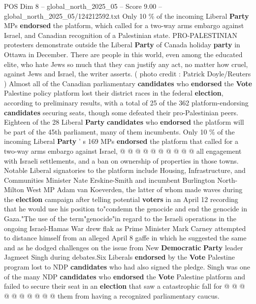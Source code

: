 \begin{textsample}{POS Dim 8 – global\_north\_2025\_05 – Score 9.00 – global\_north\_2025\_05/124212592.txt}  \label{ex:f8_pos_399}
Only 10 \% of the incoming Liberal \textbf{Party} MPs \textbf{endorsed} the platform, which called for a two-way arms embargo against Israel, and Canadian recognition of a Palestinian state.
PRO-PALESTINIAN protesters demonstrate outside the Liberal \textbf{Party} of Canada holiday \textbf{party} in Ottawa in December.
There are people in this world, even among the educated elite, who hate Jews so much that they can justify any act, no matter how cruel, against Jews and Israel, the writer asserts. ( photo credit : Patrick Doyle/Reuters ) Almost all of the Canadian parliamentary \textbf{candidates} who \textbf{endorsed} the \textbf{Vote} Palestine policy platform lost their district races in the federal \textbf{election}, according to preliminary results, with a total of 25 of the 362 platform-endorsing \textbf{candidates} securing seats, though some defeated their pro-Palestinian peers.
Eighteen of the 28 Liberal \textbf{Party} \textbf{candidates} who \textbf{endorsed} the platform will be part of the 45th parliament, many of them incumbents.
Only 10 \% of the incoming Liberal \textbf{Party} ' s 169 MPs \textbf{endorsed} the platform that called for a two-way arms embargo against Israel, @ @ @ @ @ @ @ @ @ @ all engagement with Israeli settlements, and a ban on ownership of properties in those towns.
Notable Liberal signatories to the platform include Housing, Infrastructure, and Communities Minister Nate Erskine-Smith and incumbent Burlington North-Milton West MP Adam van Koeverden, the latter of whom made waves during the \textbf{election} campaign after telling potential \textbf{voters} in an April 12 recording that he would use his position to"condemn the genocide and end the genocide in Gaza."The use of the term"genocide"in regard to the Israeli operations in the ongoing Israel-Hamas War drew flak as Prime Minister Mark Carney attempted to distance himself from an alleged April 8 gaffe in which he suggested the same and as he dodged challenges on the issue from New \textbf{Democratic} \textbf{Party} leader Jagmeet Singh during debates.Six Liberals \textbf{endorsed} by the \textbf{Vote} Palestine program lost to NDP \textbf{candidates} who had also signed the pledge.
Singh was one of the many NDP \textbf{candidates} who \textbf{endorsed} the \textbf{Vote} Palestine platform and failed to secure their seat in an \textbf{election} that saw a catastrophic fall for @ @ @ @ @ @ @ @ @ @ them from having a recognized parliamentary caucus.

\end{textsample}
